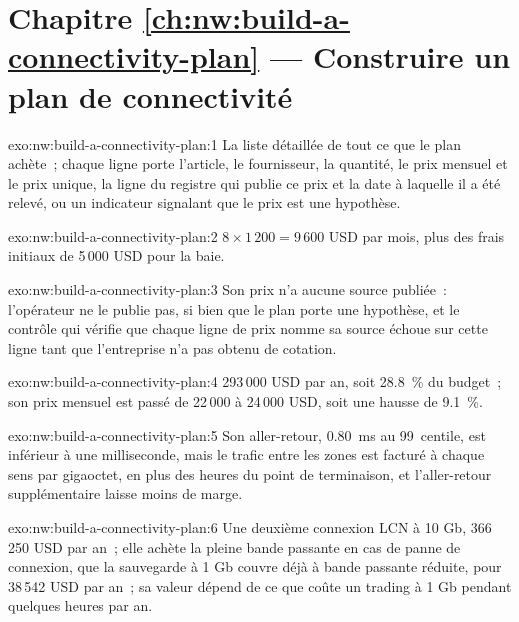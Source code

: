 \section*{Chapitre \ref{ch:nw:build-a-connectivity-plan} --- Construire un plan de connectivité}

\begin{solution}{exo:nw:build-a-connectivity-plan:1}
La liste détaillée de tout ce que le plan achète~; chaque ligne porte l'article, le fournisseur, la quantité, le prix mensuel et le prix
unique, la ligne du registre qui publie ce prix et la date à laquelle il a été relevé, ou un indicateur signalant que le prix est une hypothèse.
\end{solution}

\begin{solution}{exo:nw:build-a-connectivity-plan:2}
$8 \times 1\,200 = 9\,600$ USD par mois, plus des frais initiaux de 5\,000 USD pour la baie.
\end{solution}

\begin{solution}{exo:nw:build-a-connectivity-plan:3}
Son prix n'a aucune source publiée~: l'opérateur ne le publie pas, si bien que le plan porte une hypothèse, et le contrôle qui vérifie que chaque ligne de prix
nomme sa source échoue sur cette ligne tant que l'entreprise n'a pas obtenu de cotation.
\end{solution}

\begin{solution}{exo:nw:build-a-connectivity-plan:4}
293\,000 USD par an, soit 28.8~\% du budget~; son prix mensuel est passé de 22\,000 à 24\,000 USD, soit une hausse de 9.1~\%.
\end{solution}

\begin{solution}{exo:nw:build-a-connectivity-plan:5}
Son aller-retour, \qty{0.80}{\milli\second} au 99~centile, est inférieur à une milliseconde, mais le trafic entre les zones est facturé à chaque
sens par gigaoctet, en plus des heures du point de terminaison, et l'aller-retour supplémentaire laisse moins de marge.
\end{solution}

\begin{solution}{exo:nw:build-a-connectivity-plan:6}
Une deuxième connexion LCN à 10 Gb, 366\,250 USD par an~; elle achète la pleine bande passante en cas de panne de connexion, que la sauvegarde à 1 Gb
couvre déjà à bande passante réduite, pour 38\,542 USD par an~; sa valeur dépend de ce que coûte un trading à 1 Gb pendant quelques heures par an.
\end{solution}

